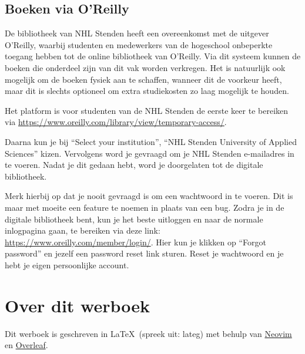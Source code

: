 
\subsection{Boeken via O'Reilly}
De bibliotheek van NHL Stenden heeft een overeenkomst met de uitgever O’Reilly, waarbij studenten en medewerkers van de hogeschool onbeperkte toegang hebben tot de online bibliotheek van O’Reilly. Via dit systeem kunnen de boeken die onderdeel zijn van dit vak worden verkregen. Het is natuurlijk ook mogelijk om de boeken fysiek aan te schaffen, wanneer dit de voorkeur heeft, maar dit is slechts optioneel om extra studiekosten zo laag mogelijk te houden.

Het platform is voor studenten van de NHL Stenden de eerste keer te bereiken via
\url{https://www.oreilly.com/library/view/temporary-access/}. 

Daarna kun je bij ``Select your institution'', ``NHL Stenden University of Applied Sciences'' kizen. Vervolgens word je gevraagd om je NHL Stenden e-mailadres in te voeren. Nadat je dit gedaan hebt, word je doorgelaten tot de digitale bibliotheek.

Merk hierbij op dat je nooit gevraagd is om een wachtwoord in te voeren. Dit is maar met moeite een feature te noemen in plaats van een bug. Zodra je in de digitale bibliotheek bent, kun je het beste uitloggen en naar de normale inlogpagina gaan, te bereiken via deze link: \url{https://www.oreilly.com/member/login/}. Hier kun je klikken op ``Forgot password'' en jezelf een password reset link sturen. Reset je wachtwoord en je hebt je eigen persoonlijke account.

\section*{Over dit werboek}
Dit werboek is geschreven in \LaTeX\ (spreek uit: lateg) met behulp van \href{https://neovim.io/}{Neovim} en \href{https://www.overleaf.com}{Overleaf}. 

